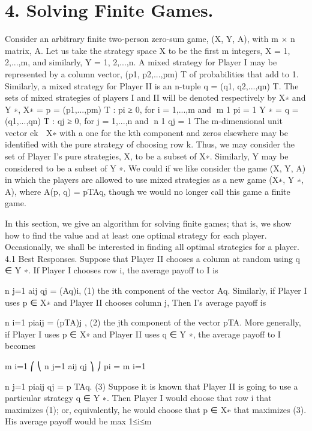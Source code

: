 \documentclass[]{report}
\begin{document}

\section{4. Solving Finite Games.}
Consider an arbitrary finite two-person zero-sum game, (X, Y, A), with m × n matrix,
A. Let us take the strategy space X to be the first m integers, X = {1, 2,...,m}, and
similarly, Y = {1, 2,...,n}. A mixed strategy for Player I may be represented by a column
vector, (p1, p2,...,pm)
T of probabilities that add to 1. Similarly, a mixed strategy for Player
II is an n-tuple q = (q1, q2,...,qn)
T. The sets of mixed strategies of players I and II will
be denoted respectively by X∗ and Y ∗,
X∗ = {p = (p1,...,pm)
T : pi ≥ 0, for i = 1,...,m and m
1 pi = 1}
Y ∗ = {q = (q1,...,qn)
T : qj ≥ 0, for j = 1,...,n and n
1 qj = 1}
The m-dimensional unit vector ek ∈ X∗ with a one for the kth component and zeros
elsewhere may be identified with the pure strategy of choosing row k. Thus, we may
consider the set of Player I’s pure strategies, X, to be a subset of X∗. Similarly, Y may
be considered to be a subset of Y ∗. We could if we like consider the game (X, Y, A) in
which the players are allowed to use mixed strategies as a new game (X∗, Y ∗, A), where
A(p, q) = pTAq, though we would no longer call this game a finite game.

In this section, we give an algorithm for solving finite games; that is, we show how to
find the value and at least one optimal strategy for each player. Occasionally, we shall be
interested in finding all optimal strategies for a player.
4.1 Best Responses. Suppose that Player II chooses a column at random using
q ∈ Y ∗. If Player I chooses row i, the average payoff to I is

n
j=1
aij qj = (Aq)i, (1)
the ith component of the vector Aq. Similarly, if Player I uses p ∈ X∗ and Player II
chooses column j, Then I’s average payoff is

n
i=1
piaij = (pTA)j , (2)
the jth component of the vector pTA. More generally, if Player I uses p ∈ X∗ and Player
II uses q ∈ Y ∗, the average payoff to I becomes

m
i=1
⎛
⎝
n
j=1
aij qj
⎞
⎠ pi = 
m
i=1

n
j=1
piaij qj = p
TAq. (3)
Suppose it is known that Player II is going to use a particular strategy q ∈ Y ∗. Then
Player I would choose that row i that maximizes (1); or, equivalently, he would choose
that p ∈ X∗ that maximizes (3). His average payoff would be
max
1≤i≤m
\end{document}
